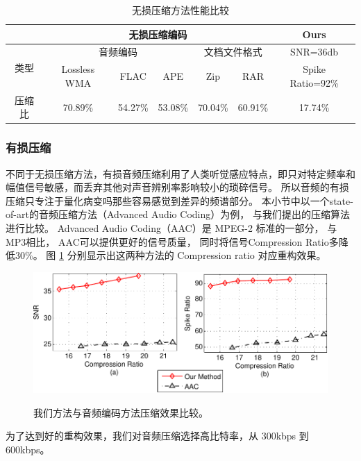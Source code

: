 \begin{table}[ht]%
\caption{无损压缩方法性能比较} %
\label{tab:T2} \centering
\begin{tabular}{|c||c|c|c|c|c|c|}%
\hline
 & \multicolumn{5}{c|}{无损压缩编码} & Ours\\
  \hline \hline
 \multirow{2}{*}{类型} & \multicolumn{3}{c|}{音频编码} & \multicolumn{2}{c|}{文档文件格式} & SNR=36db\\
 \cline{2-6}
 & Lossless WMA & FLAC & APE & Zip & RAR &Spike Ratio=92\%\\
 \cline{1-7}
 压缩比 & 70.89\% & 54.27\% & 53.08\% & 70.04\% & 60.91\% & 17.74\%\\
\hline
\end{tabular}
\end{table}



\subsubsection{有损压缩}
不同于无损压缩方法，有损音频压缩利用了人类听觉感应特点，即只对特定频率和幅值信号敏感，而丢弃其他对声音辨别率影响较小的琐碎信号。 所以音频的有损压缩只专注于量化病变吗那些容易感觉到差异的频谱部分。 本小节中以一个state-of-art的音频压缩方法（Advanced Audio Coding）为例， 与我们提出的压缩算法进行比较。 Advanced Audio Coding（AAC）是 MPEG-2 标准的一部分， 与MP3相比， AAC可以提供更好的信号质量， 同时将信号Compression Ratio多降低30\%。 图 \ref{fig:Comparison-AAC and Ours} 分别显示出这两种方法的 Compression ratio 对应重构效果。


\begin{figure}
  \centering
  \includegraphics{Pictures/Compression/f13-crop.pdf}\\
  \caption{ 我们方法与音频编码方法压缩效果比较。 }\label{fig:Comparison-AAC and Ours}
\end{figure}


为了达到好的重构效果，我们对音频压缩选择高比特率，从 300kbps 到 600kbps。 

